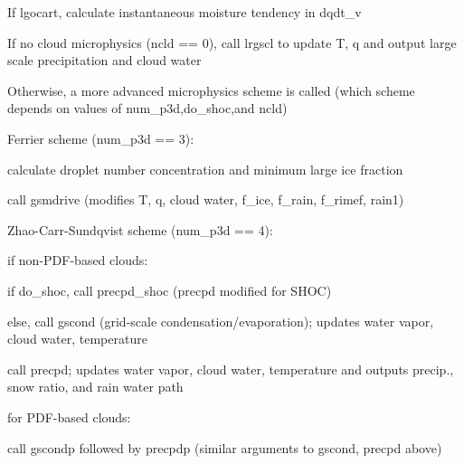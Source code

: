 \begin{DoxyItemize}
\item If \textquotesingle{}lgocart\textquotesingle{}, calculate instantaneous moisture tendency in dqdt\+\_\+v
\item If no cloud microphysics (ncld == 0), call \textquotesingle{}lrgscl\textquotesingle{} to update T, q and output large scale precipitation and cloud water
\item Otherwise, a more advanced microphysics scheme is called (which scheme depends on values of \textquotesingle{}num\+\_\+p3d\textquotesingle{},\textquotesingle{}do\+\_\+shoc\textquotesingle{},and \textquotesingle{}ncld\textquotesingle{})
\item Ferrier scheme (num\+\_\+p3d == 3)\+:
\begin{DoxyItemize}
\item calculate droplet number concentration and minimum large ice fraction
\item call \textquotesingle{}gsmdrive\textquotesingle{} (modifies T, q, cloud water, \textquotesingle{}f\+\_\+ice\textquotesingle{}, \textquotesingle{}f\+\_\+rain\textquotesingle{}, \textquotesingle{}f\+\_\+rimef\textquotesingle{}, \textquotesingle{}rain1\textquotesingle{})
\end{DoxyItemize}
\item Zhao-\/\+Carr-\/\+Sundqvist scheme (num\+\_\+p3d == 4)\+:
\begin{DoxyItemize}
\item if non-\/\+P\+D\+F-\/based clouds\+:
\begin{DoxyItemize}
\item if \textquotesingle{}do\+\_\+shoc\textquotesingle{}, call \textquotesingle{}precpd\+\_\+shoc\textquotesingle{} (precpd modified for S\+H\+OC)
\item else, call \textquotesingle{}gscond\textquotesingle{} (grid-\/scale condensation/evaporation); updates water vapor, cloud water, temperature
\begin{DoxyItemize}
\item call \textquotesingle{}precpd\textquotesingle{}; updates water vapor, cloud water, temperature and outputs precip., snow ratio, and rain water path
\end{DoxyItemize}
\end{DoxyItemize}
\item for P\+D\+F-\/based clouds\+:
\begin{DoxyItemize}
\item call \textquotesingle{}gscondp\textquotesingle{} followed by \textquotesingle{}precpdp\textquotesingle{} (similar arguments to gscond, precpd above)

\end{DoxyItemize}
\end{DoxyItemize}
\end{DoxyItemize}
